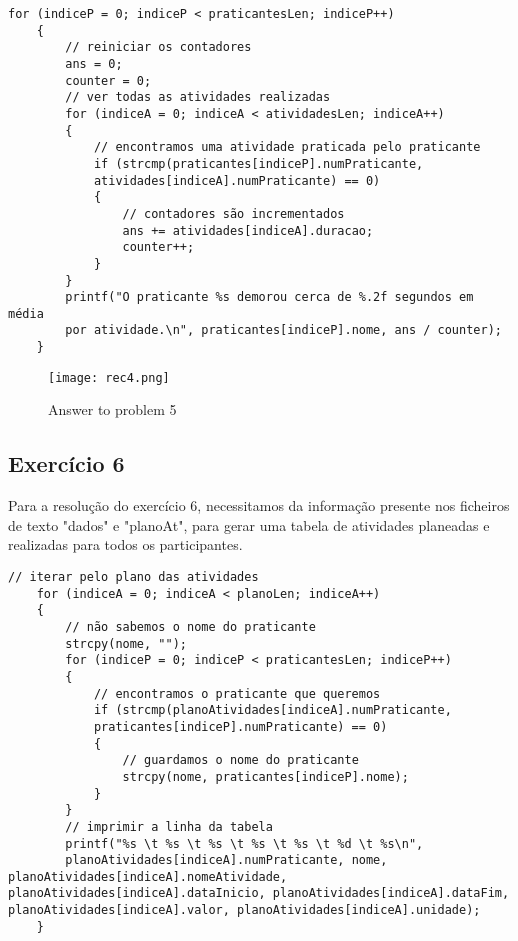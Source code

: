 \begin{lstlisting}[caption=Exemplo exercício 5]
for (indiceP = 0; indiceP < praticantesLen; indiceP++)
    {
        // reiniciar os contadores
        ans = 0;
        counter = 0;
        // ver todas as atividades realizadas
        for (indiceA = 0; indiceA < atividadesLen; indiceA++)
        {
            // encontramos uma atividade praticada pelo praticante
            if (strcmp(praticantes[indiceP].numPraticante, 
            atividades[indiceA].numPraticante) == 0)
            {
                // contadores são incrementados
                ans += atividades[indiceA].duracao;
                counter++;
            }
        }
        printf("O praticante %s demorou cerca de %.2f segundos em média 
        por atividade.\n", praticantes[indiceP].nome, ans / counter);
    }
\end{lstlisting}

\begin{figure}[htbp]
\centering
\texttt{[image: rec4.png]}  %
\caption{Answer to problem 5}
\label{fig:ex5}
\end{figure}

\subsection{Exercício 6}
Para a resolução do exercício 6, necessitamos da informação presente nos ficheiros de texto "dados" e "planoAt", para gerar uma tabela de atividades planeadas e realizadas para todos os participantes.

\begin{lstlisting}[caption=Exemplo exercício 6]
// iterar pelo plano das atividades
    for (indiceA = 0; indiceA < planoLen; indiceA++)
    {
        // não sabemos o nome do praticante
        strcpy(nome, "");
        for (indiceP = 0; indiceP < praticantesLen; indiceP++)
        {
            // encontramos o praticante que queremos
            if (strcmp(planoAtividades[indiceA].numPraticante,
            praticantes[indiceP].numPraticante) == 0)
            {
                // guardamos o nome do praticante
                strcpy(nome, praticantes[indiceP].nome);
            }
        }
        // imprimir a linha da tabela
        printf("%s \t %s \t %s \t %s \t %s \t %d \t %s\n", 
        planoAtividades[indiceA].numPraticante, nome, planoAtividades[indiceA].nomeAtividade, planoAtividades[indiceA].dataInicio, planoAtividades[indiceA].dataFim, planoAtividades[indiceA].valor, planoAtividades[indiceA].unidade);
    }
\end{lstlisting}

